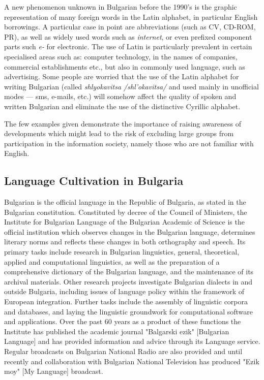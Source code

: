 \begin{multicols}{2}
A new phenomenon unknown in Bulgarian before the 1990’s is the graphic representation of many foreign words in the Latin alphabet, in particular English borrowings. A particular case in point are abbreviations (such as CV, CD-ROM, PR), as well as widely used words such as \textit{internet}, or even prefixed component parts such \textit{e-} for electronic. The use of Latin is particularly prevalent in certain specialised areas such as: computer technology, in the names of companies, commercial establishments etc., but also in commonly used language, such as advertising. Some people are worried that the use of the Latin alphabet for writing Bulgarian (called \textit{{shlyokavitsa} /shl’okavitsa/} and used mainly in unofficial modes — sms, e-mails, etc.) \cite{shlyokavica} will somehow affect the quality of spoken and written Bulgarian and eliminate the use of the distinctive Cyrillic alphabet.

The few examples given demonstrate the importance of raising awareness of developments which might lead to the risk of excluding large groups from participation in the information society, namely those who are not familiar with English.

\subsection{Language Cultivation in Bulgaria}

Bulgarian is the official language in the Republic of Bulgaria, as stated in the Bulgarian constitution. Constituted by decree of the Council of Ministers, the Institute for Bulgarian Language of the Bulgarian Academic of Science is the official institution which observes changes in the Bulgarian language, determines literary norms and reflects these changes in both orthography and speech. Its primary tasks include research in Bulgarian linguistics, general, theoretical, applied and computational linguistics, as well as the preparation of a comprehensive dictionary of the Bulgarian language, and the maintenance of its archival materials. Other research projects investigate Bulgarian dialects in and outside Bulgaria, including issues of language policy within the framework of European integration. Further tasks include the assembly of linguistic corpora and databases, and laying the linguistic groundwork for computational software and applications. Over the past 60 years as a 
 product of these functions the Institute has published the academic journal "Balgarski ezik" [Bulgarian Language] and has provided information and advice through its Language service. Regular broadcasts on Bulgarian National Radio are also provided and until recently and collaboration with Bulgarian National Television has produced "Ezik moy" [My Language] broadcast. 


\end{multicols}
